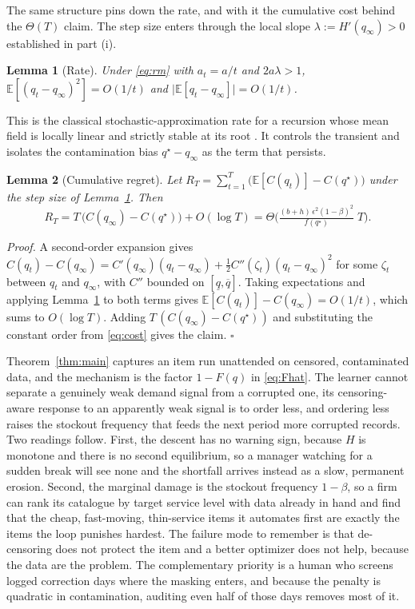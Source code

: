 \documentclass[11pt]{article}
\theoremstyle{plain}
\newtheorem{lemma}{Lemma}
\begin{document}
The same structure pins down the rate, and with it the cumulative cost behind the
$\Theta(T)$ claim. The step size enters through the local slope
$\lambda:=H'(q_\infty)>0$ established in part (i).

\begin{lemma}[Rate]\label{lem:rate}
Under \eqref{eq:rm} with $a_t=a/t$ and $2a\lambda>1$,
$\mathbb E[(q_t-q_\infty)^2]=O(1/t)$ and $\bigl|\mathbb E[q_t-q_\infty]\bigr|=O(1/t)$.
\end{lemma}

\noindent This is the classical stochastic-approximation rate for a recursion whose
mean field is locally linear and strictly stable at its root
\citep{kushner2003stochastic}. It controls the transient and isolates the
contamination bias $q^\star-q_\infty$ as the term that persists.

\begin{lemma}[Cumulative regret]\label{lem:regret}
Let $R_T=\sum_{t=1}^{T}\bigl(\mathbb E[C(q_t)]-C(q^\star)\bigr)$ under the step size
of Lemma~\ref{lem:rate}. Then
\[
  R_T=T\,\bigl(C(q_\infty)-C(q^\star)\bigr)+O(\log T)
     =\Theta\!\Big(\tfrac{(b+h)\,\epsilon^2(1-\beta)^2}{f(q^\star)}\;T\Big).
\]
\end{lemma}

\noindent\textit{Proof.}
A second-order expansion gives
$C(q_t)-C(q_\infty)=C'(q_\infty)(q_t-q_\infty)+\tfrac12C''(\zeta_t)(q_t-q_\infty)^2$
for some $\zeta_t$ between $q_t$ and $q_\infty$, with $C''$ bounded on
$[\underline q,\overline q]$. Taking expectations and applying Lemma~\ref{lem:rate}
to both terms gives $\mathbb E[C(q_t)]-C(q_\infty)=O(1/t)$, which sums to
$O(\log T)$. Adding $T\,(C(q_\infty)-C(q^\star))$ and substituting the constant
order from \eqref{eq:cost} gives the claim. \hfill$\square$

Theorem~\ref{thm:main} captures an item run unattended on censored, contaminated
data, and the mechanism is the factor $1-F(q)$ in \eqref{eq:Fhat}. The learner
cannot separate a genuinely weak demand signal from a corrupted one, its
censoring-aware response to an apparently weak signal is to order less, and
ordering less raises the stockout frequency that feeds the next period more
corrupted records. Two readings follow. First, the descent has no warning sign,
because $H$ is monotone and there is no second equilibrium, so a manager watching
for a sudden break will see none and the shortfall arrives instead as a slow,
permanent erosion. Second, the marginal damage is the stockout frequency $1-\beta$,
so a firm can rank its catalogue by target service level with data already in hand
and find that the cheap, fast-moving, thin-service items it automates first are
exactly the items the loop punishes hardest. The failure mode to remember is that
de-censoring does not protect the item and a better optimizer does not help,
because the data are the problem. The complementary priority is a human who screens
logged correction days where the masking enters, and because the penalty is
quadratic in contamination, auditing even half of those days removes most of it.
\end{document}
